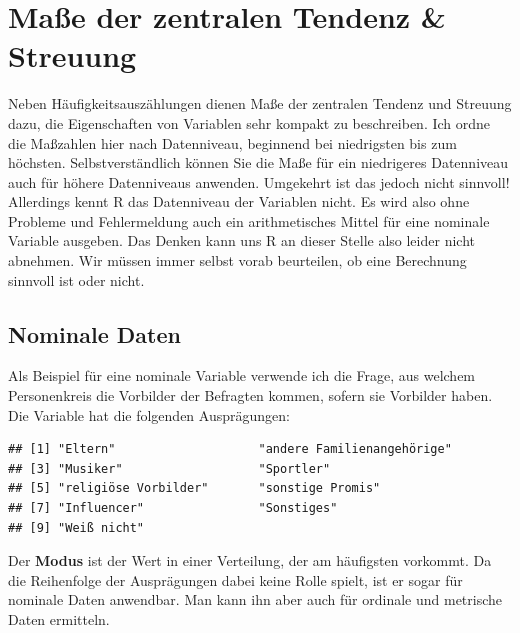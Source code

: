 \documentclass[
]{book}
\newenvironment{Shaded}{\begin{snugshade}}{\end{snugshade}}
\newcommand{\FunctionTok}[1]{\textcolor[rgb]{0.00,0.00,0.00}{#1}}
\newcommand{\NormalTok}[1]{#1}
\newcommand{\SpecialCharTok}[1]{\textcolor[rgb]{0.00,0.00,0.00}{#1}}
\begin{document}
\hypertarget{mauxdfe-der-zentralen-tendenz-streuung}{%
\section{Maße der zentralen Tendenz \& Streuung}\label{mauxdfe-der-zentralen-tendenz-streuung}}

Neben Häufigkeitsauszählungen dienen Maße der zentralen Tendenz und Streuung dazu, die Eigenschaften von Variablen sehr kompakt zu beschreiben. Ich ordne die Maßzahlen hier nach Datenniveau, beginnend bei niedrigsten bis zum höchsten. Selbstverständlich können Sie die Maße für ein niedrigeres Datenniveau auch für höhere Datenniveaus anwenden. Umgekehrt ist das jedoch nicht sinnvoll! Allerdings kennt R das Datenniveau der Variablen nicht. Es wird also ohne Probleme und Fehlermeldung auch ein arithmetisches Mittel für eine nominale Variable ausgeben. Das Denken kann uns R an dieser Stelle also leider nicht abnehmen. Wir müssen immer selbst vorab beurteilen, ob eine Berechnung sinnvoll ist oder nicht.

\hypertarget{nominale-daten}{%
\subsection{Nominale Daten}\label{nominale-daten}}

Als Beispiel für eine nominale Variable verwende ich die Frage, aus welchem Personenkreis die Vorbilder der Befragten kommen, sofern sie Vorbilder haben. Die Variable hat die folgenden Ausprägungen:

\begin{Shaded}
\end{Shaded}

\begin{verbatim}
## [1] "Eltern"                    "andere Familienangehörige"
## [3] "Musiker"                   "Sportler"                 
## [5] "religiöse Vorbilder"       "sonstige Promis"          
## [7] "Influencer"                "Sonstiges"                
## [9] "Weiß nicht"
\end{verbatim}

Der \textbf{Modus} ist der Wert in einer Verteilung, der am häufigsten vorkommt. Da die Reihenfolge der Ausprägungen dabei keine Rolle spielt, ist er sogar für nominale Daten anwendbar. Man kann ihn aber auch für ordinale und metrische Daten ermitteln.
\end{document}
